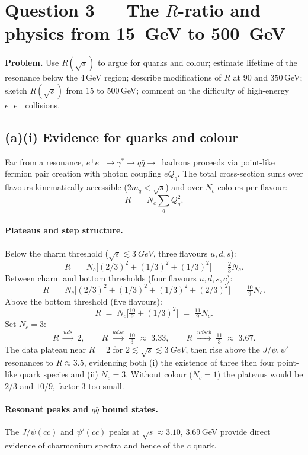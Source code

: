 \documentclass[11pt]{article}
\begin{document}
\section*{Question 3 --- The $R$-ratio and physics from \SI{15}{GeV} to \SI{500}{GeV}}

\textbf{Problem.} Use $R(\sqrt s)$ to argue for quarks and colour; estimate lifetime of the resonance below the $4\,$GeV region; describe modifications of $R$ at $90$ and $350\,$GeV; sketch $R(\sqrt s)$ from $15$ to $500\,$GeV; comment on the difficulty of high-energy $e^{+}e^{-}$ collisions.

\subsection*{(a)(i) Evidence for quarks and colour}

Far from a resonance, $e^{+}e^{-}\to\gamma^{*}\to q\bar q\to$~hadrons proceeds via point-like fermion pair creation with photon coupling $eQ_{q}$. The total cross-section sums over flavours kinematically accessible ($2m_{q}<\sqrt s$) and over $N_{c}$ colours per flavour:
\begin{equation}
R\;=\;N_{c}\sum_{q}Q_{q}^{2}.
\label{eq:R-formula}
\end{equation}
\paragraph{Plateaus and step structure.} Below the charm threshold ($\sqrt s\lesssim\SI{3}{GeV}$, three flavours $u,d,s$):
\[
R\;=\;N_{c}\bigl[(2/3)^{2}+(1/3)^{2}+(1/3)^{2}\bigr]\;=\;\tfrac{2}{3}N_{c}.
\]
Between charm and bottom thresholds (four flavours $u,d,s,c$):
\[
R\;=\;N_{c}\bigl[(2/3)^{2}+(1/3)^{2}+(1/3)^{2}+(2/3)^{2}\bigr]\;=\;\tfrac{10}{9}N_{c}.
\]
Above the bottom threshold (five flavours):
\[
R\;=\;N_{c}\bigl[\tfrac{10}{9}+(1/3)^{2}\bigr]\;=\;\tfrac{11}{9}N_{c}.
\]
Set $N_{c}=3$:
\[
R\;\stackrel{uds}{\to}\;2,\qquad R\;\stackrel{udsc}{\to}\;\tfrac{10}{3}\;\approx\;3.33,\qquad R\;\stackrel{udscb}{\to}\;\tfrac{11}{3}\;\approx\;3.67.
\]
The data plateau near $R=2$ for $2\lesssim\sqrt s\lesssim\SI{3}{GeV}$, then rise above the $J/\psi,\psi'$ resonances to $R\approx 3.5$, evidencing both (i) the existence of three then four point-like quark species and (ii) $N_{c}=3$. Without colour ($N_{c}=1$) the plateaus would be $2/3$ and $10/9$, factor $3$ too small.

\paragraph{Resonant peaks and $q\bar q$ bound states.} The $J/\psi(c\bar c)$ and $\psi'(c\bar c)$ peaks at $\sqrt s\approx 3.10,\,3.69\,$GeV provide direct evidence of charmonium spectra and hence of the $c$ quark.
\end{document}
